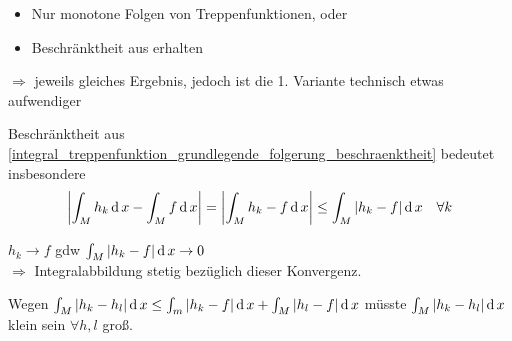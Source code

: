 \begin{boldenvironment}[Motivation] \hspace*{0pt}
	\begin{itemize}[topsep=\dimexpr -\baselineskip / 2\relax]
		\item Nur monotone Folgen von Treppenfunktionen, oder
		\item Beschränktheit aus  erhalten
	\end{itemize}
	$\Rightarrow$ jeweils gleiches Ergebnis, jedoch ist die 1. Variante technisch etwas aufwendiger
	
	Beschränktheit aus  \ref{integral_treppenfunktion_grundlegende_folgerung_beschraenktheit} bedeutet insbesondere \begin{align*}
		\left\vert \int_M h_k\operatorname{d} x - \int_M f \operatorname{d} x \right\vert = \left\vert \int_M h_k - f \operatorname{d} x \right\vert \le \int_M \vert h_k - f\vert \operatorname{d} x \quad\forall k
	\end{align*}
\end{boldenvironment}
	
\begin{boldenvironment} $h_k\to f$ \gls{gdw} $\int_M \vert h_k - f\vert \operatorname{d} x\to 0$\\
	$\Rightarrow$ Integralabbildung stetig bezüglich dieser Konvergenz.
	
	Wegen $\int_M \vert h_k - h_l\vert \operatorname{d} x \le \int_m \vert h_k - f\vert \operatorname{d} x + \int_M \vert h_l -f \vert \operatorname{d} x$ müsste $\int_M \vert h_k - h_l\vert \operatorname{d} x$ klein sein $\forall h,l$ groß.
\end{boldenvironment}

